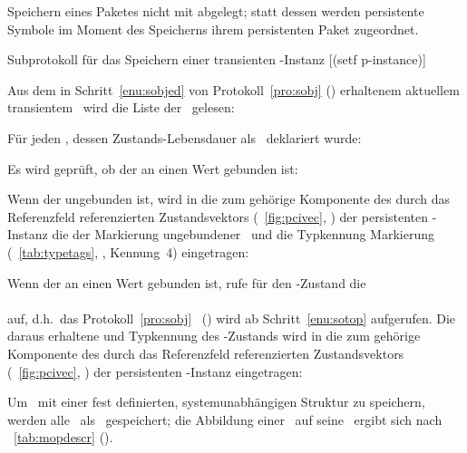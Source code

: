 Speichern eines Paketes nicht mit abgelegt; statt dessen werden
persistente Symbole im Moment des Speicherns ihrem persistenten Paket
zugeordnet.
%
\begin{infol}%
%
\acaption%
 {Subprotokoll f\"{u}r das Speichern einer transienten
  \protect\clos-Instanz}%
 [(setf p-instance)]%
 \label{pro:scli}%
%
\item Aus dem in Schritt~\ref{enu:sobjed} von Protokoll~\ref{pro:sobj}
 (\citepage{\pageref{enu:sobjed}}) erhaltenem
aktuellem transientem \clsdo\ wird die Liste der \sltdo[e]\ gelesen:\\
%
\item F\"{u}r jeden \Slt, dessen Zustands-Lebensdauer als
\ deklariert wurde:
%
\begin{block}
%
\item Es wird gepr\"{u}ft, ob der \Slt\/ an einen Wert gebunden ist:\\
%
\item Wenn der \Slt\/ ungebunden ist, wird in die zum \Slt\/ geh\"{o}rige
Komponente des durch das Referenzfeld referenzierten Zustandsvektors
(\figurename~\ref{fig:pcivec},
\citepage{\pageref{fig:pcivec}}) der persistenten \clos-Instanz
die \sobjid\/ der Markierung \rglq{}ungebundener \Slt\rgrq\ und die
Typkennung Markierung (\tablename~\ref{tab:typetags},
\citepage{\pageref{tab:typetags}}, Kennung~4) eingetragen:\\
%
\item Wenn der \Slt\/ an einen Wert gebunden ist, rufe f\"{u}r den
\Slt\/-Zustand die \gfn\\ 
\\
auf, d.h.\ das Protokoll~\ref{pro:sobj}
\ (\citepage{\pageref{pro:sobj}}) wird ab
Schritt~\ref{enu:sotop} aufgerufen. Die daraus erhaltene \sobjid\/ und
Typkennung des \Slt\/-Zustands wird in die zum \Slt\/ geh\"{o}rige
Komponente des durch das Referenzfeld referenzierten Zustandsvektors
(\figurename~\ref{fig:pcivec}, \citepage{\pageref{fig:pcivec}}) der
persistenten \clos-Instanz eingetragen:\\
%
\end{block}%
%
\end{infol}%
%
Um \mo[e]\ mit einer fest definierten, sy\-stem\-un\-ab\-h\"{a}n\-gi\-gen
Struktur zu speichern, werden alle \mo[e]\ als \deo[e]\ gespeichert;
die Abbildung einer \mc\ auf seine \dec\ ergibt sich nach
\tablename~\ref{tab:mopdescr} (\citepage{\pageref{tab:mopdescr}}).
